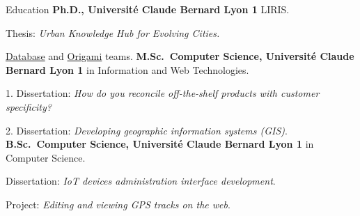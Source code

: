 \begin{rubric}{Education}
%
	\textbf{Ph.D., Université Claude Bernard Lyon 1} LIRIS.
	\par Thesis: \emph{Urban Knowledge Hub for Evolving Cities.}
    \par \href{https://liris.cnrs.fr/en/team/bd}{Database} and \href{https://liris.cnrs.fr/en/team/origami}{Origami} teams.
%
%
	\textbf{M.Sc.~Computer Science, Université Claude Bernard Lyon 1} in Information and Web Technologies.
	\par 1. Dissertation: \emph{How do you reconcile off-the-shelf products with customer specificity?}
    \par 2. Dissertation: \emph{Developing geographic information systems (GIS)}.
% 
%
	\textbf{B.Sc.~Computer Science, Université Claude Bernard Lyon 1} in Computer Science.
	\par Dissertation: \emph{IoT devices administration interface development}.
    \par Project: \emph{Editing and viewing GPS tracks on the web}.
\end{rubric}